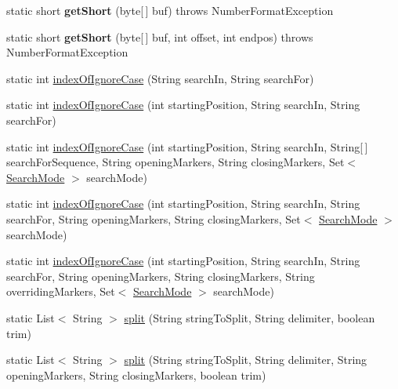 \begin{DoxyCompactItemize}
static short {\bfseries get\+Short} (byte\mbox{[}$\,$\mbox{]} buf)  throws Number\+Format\+Exception 
\item 
\mbox{\label{classcom_1_1mysql_1_1jdbc_1_1_string_utils_adc0d012cbbd96b631e701a0236463516}} 
static short {\bfseries get\+Short} (byte\mbox{[}$\,$\mbox{]} buf, int offset, int endpos)  throws Number\+Format\+Exception 
\item 
static int \mbox{\hyperlink{classcom_1_1mysql_1_1jdbc_1_1_string_utils_a6d53939d6e9719bdac7d843213d387c8}{index\+Of\+Ignore\+Case}} (String search\+In, String search\+For)
\item 
static int \mbox{\hyperlink{classcom_1_1mysql_1_1jdbc_1_1_string_utils_aa5b9bbcd397f4e878c473c861c14e739}{index\+Of\+Ignore\+Case}} (int starting\+Position, String search\+In, String search\+For)
\item 
static int \mbox{\hyperlink{classcom_1_1mysql_1_1jdbc_1_1_string_utils_aa878fb59ee51a94be844867255666d74}{index\+Of\+Ignore\+Case}} (int starting\+Position, String search\+In, String\mbox{[}$\,$\mbox{]} search\+For\+Sequence, String opening\+Markers, String closing\+Markers, Set$<$ \mbox{\hyperlink{enumcom_1_1mysql_1_1jdbc_1_1_string_utils_1_1_search_mode}{Search\+Mode}} $>$ search\+Mode)
\item 
static int \mbox{\hyperlink{classcom_1_1mysql_1_1jdbc_1_1_string_utils_adad7a6d6f0a6d0a8c63355dabbf4ed35}{index\+Of\+Ignore\+Case}} (int starting\+Position, String search\+In, String search\+For, String opening\+Markers, String closing\+Markers, Set$<$ \mbox{\hyperlink{enumcom_1_1mysql_1_1jdbc_1_1_string_utils_1_1_search_mode}{Search\+Mode}} $>$ search\+Mode)
\item 
static int \mbox{\hyperlink{classcom_1_1mysql_1_1jdbc_1_1_string_utils_add4ac2b0e744a88735d527491bd75450}{index\+Of\+Ignore\+Case}} (int starting\+Position, String search\+In, String search\+For, String opening\+Markers, String closing\+Markers, String overriding\+Markers, Set$<$ \mbox{\hyperlink{enumcom_1_1mysql_1_1jdbc_1_1_string_utils_1_1_search_mode}{Search\+Mode}} $>$ search\+Mode)
\item 
static List$<$ String $>$ \mbox{\hyperlink{classcom_1_1mysql_1_1jdbc_1_1_string_utils_a9585acb209b381778e2d9ffde265e2f9}{split}} (String string\+To\+Split, String delimiter, boolean trim)
\item 
static List$<$ String $>$ \mbox{\hyperlink{classcom_1_1mysql_1_1jdbc_1_1_string_utils_a0c4aba0dfcc1d3d7f60241b4c676aff4}{split}} (String string\+To\+Split, String delimiter, String opening\+Markers, String closing\+Markers, boolean trim)

\end{DoxyCompactItemize}
